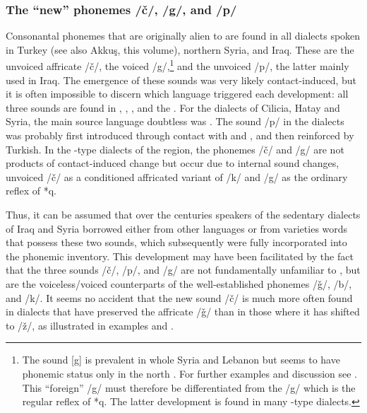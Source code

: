 \documentclass[output=paper]{langsci/langscibook}
\begin{document}
  \subsubsection{The “new” phonemes /č/, /g/, and /p/}\label{newphonemes} 

Consonantal phonemes that are originally alien to  are found in all  dialects spoken in Turkey (see also Akkuş, this volume), northern Syria, and Iraq. These are the unvoiced affricate /č/, the voiced /g/,\footnote{The sound [g] is prevalent in whole Syria and Lebanon but seems to have phonemic status only in the north \citep[26]{Sabuni1980}. For further examples and discussion see \citet{Ferguson1969}. This “foreign” /g/ must therefore be differentiated from the /g/ which is the regular reflex of  *q. The latter development is found in many -type dialects.} and the unvoiced /p/, the latter mainly used in Iraq. The emergence of these sounds was very likely contact-induced, but it is often impossible to discern which language triggered each development: all three sounds are found in , , , and the . For the dialects of Cilicia, Hatay and Syria, the main {source language} doubtless was . The sound /p/ in the  dialects was probably first introduced through contact with  and , and then reinforced by  {Turkish}. In the -type dialects of the region, the phonemes /č/ and /g/ are not products of contact-induced change but occur due to internal sound changes, unvoiced /č/ as a conditioned affricated variant of /k/ and /g/ as the ordinary reflex of  *q. 

Thus, it can be assumed that over the centuries speakers of the sedentary dialects of Iraq and Syria borrowed either from other languages or from   varieties words that possess these two sounds, which subsequently were fully incorporated into the phonemic inventory. This development may have been facilitated by the fact that the three sounds /č/, /p/, and /g/ are not fundamentally unfamiliar to , but are the voiceless/voiced counterparts of the well-established phonemes /ǧ/, /b/, and /k/. It seems no accident that the new sound /č/ is much more often found in dialects that have preserved the affricate /ǧ/ than in those where it has shifted to /ž/, as illustrated in examples  and .

\ea\label{Aleppo}
 \citep[205--210]{Sabuni1980}
\end{document}
